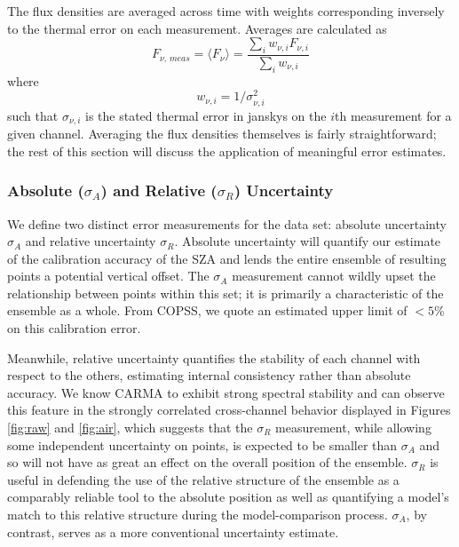 \documentclass{article}
\begin{document}
	The flux densities are averaged across time with weights corresponding inversely to the thermal error on each measurement.
	Averages are calculated as
	$$F_{\nu,\,meas} = \langle F_{\nu} \rangle = \frac{ \sum_{i} w_{\nu, i} F_{\nu,i} }{ \sum_{i} w_{\nu, i} }$$
	where $$w_{\nu, i} = 1/\sigma_{\nu, i}^{2}$$
	such that $\sigma_{\nu, i}$ is the stated thermal error in janskys on the $i$th measurement for a given channel.
	Averaging the flux densities themselves is fairly straightforward; the rest of this section will discuss the application
	of meaningful error estimates.

\subsubsection{Absolute ($\sigma_{A}$) and Relative ($\sigma_{R}$) Uncertainty} \label{s:error}
	We define two distinct error measurements for the data set: absolute uncertainty $\sigma_{A}$ and relative uncertainty $\sigma_{R}$.
	Absolute uncertainty will quantify our estimate of the calibration accuracy of the SZA and lends the entire ensemble of resulting points a potential vertical offset.
	The $\sigma_{A}$ measurement cannot wildly upset the relationship between points within this set; it is primarily a characteristic of the ensemble as a whole.
	From COPSS, we quote an estimated upper limit of $<5\%$ on this calibration error.

	Meanwhile, relative uncertainty quantifies the stability of each channel with respect to the others, estimating internal consistency rather than absolute accuracy.
	We know CARMA to exhibit strong spectral stability and can observe this feature in the strongly correlated cross-channel behavior displayed in Figures \ref{fig:raw} and \ref{fig:air}, which suggests that the $\sigma_{R}$ measurement, while allowing some independent uncertainty on points, is expected to be smaller than $\sigma_{A}$ and so will not have as great an effect on the overall position of the ensemble.
	$\sigma_{R}$ is useful in defending the use of the relative structure of the ensemble as a comparably reliable tool to the absolute position as well as quantifying a model's match to this relative structure during the model-comparison process.
	$\sigma_{A}$, by contrast, serves as a more conventional uncertainty estimate.
\end{document}
